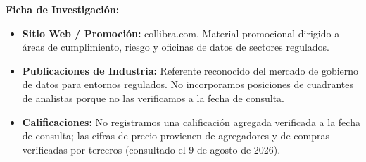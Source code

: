 \textbf{Ficha de Investigación:}
\begin{itemize}
    \item \textbf{Sitio Web / Promoción:} collibra.com. Material promocional dirigido a áreas de cumplimiento, riesgo y oficinas de datos de sectores regulados.
    \item \textbf{Publicaciones de Industria:} Referente reconocido del mercado de gobierno de datos para entornos regulados. No incorporamos posiciones de cuadrantes de analistas porque no las verificamos a la fecha de consulta.
    \item \textbf{Calificaciones:} No registramos una calificación agregada verificada a la fecha de consulta; las cifras de precio provienen de agregadores y de compras verificadas por terceros (consultado el 9 de agosto de 2026).
\end{itemize}
\vspace{0.3cm}

